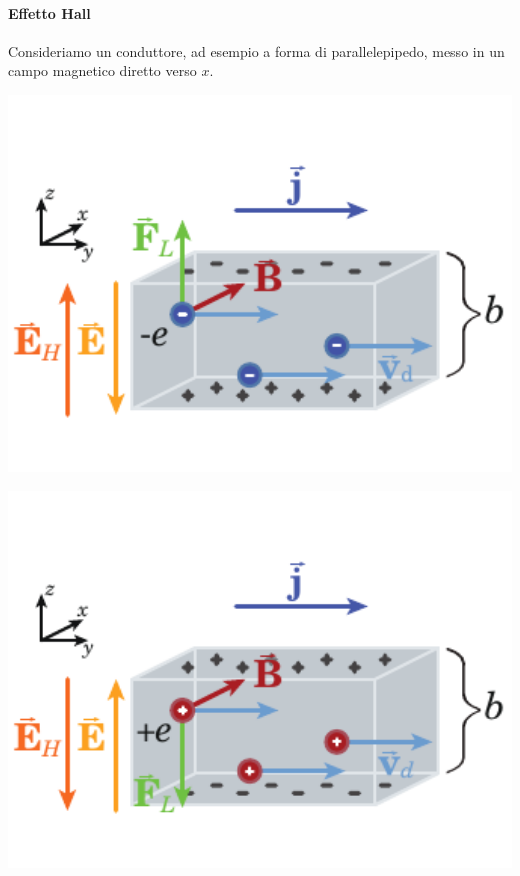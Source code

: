 \paragraph{Effetto Hall}
Consideriamo un conduttore, ad esempio a forma di parallelepipedo, messo in un campo magnetico diretto verso $x$.
\begin{center}
	\begin{minipage}{0.49\textwidth}
		\begin{center}
			\includegraphics[width=1\textwidth]{images/chp7/chp7effettohall1.pdf}
		\end{center}
	\end{minipage}
	\begin{minipage}{0.49\textwidth}
		\begin{center}
			\includegraphics[width=1\textwidth]{images/chp7/chp7effettohall2.pdf}
		\end{center}
	\end{minipage}
\end{center}
